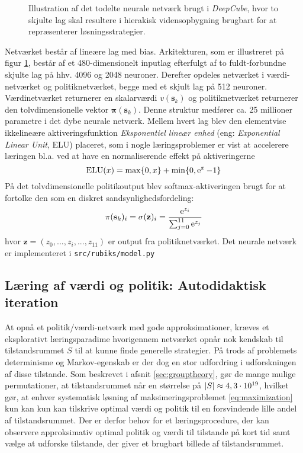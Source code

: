 \documentclass[../main.tex]{subfiles}
\begin{document}
\begin{figure}[H]
	\centering

\caption{Illustration af det todelte neurale netværk brugt i \textit{DeepCube}, hvor to skjulte lag skal resultere i hierakisk vidensopbygning brugbart for at repræsenterer løsningsstrategier.}
\label{fig:DNN}
\end{figure}
\noindent Netværket består af lineære lag med bias.  Arkitekturen, som er illustreret på figur \ref{fig:DNN}, består af et 480-dimensionelt inputlag efterfulgt af to fuldt-forbundne skjulte lag på hhv. 4096 og 2048 neuroner. Derefter opdeles netværket i værdi-netværket og politiknetværket, begge med et skjult lag på 512 neuroner. Værdinetværket returnerer en skalarværdi \(v(\mathbf s_k)\) og politiknetværket returnerer den tolvdimensionelle vektor \(\bm \pi (\mathbf s_k)\). Denne struktur medfører ca. 25 millioner parametre i det dybe neurale netværk. Mellem hvert lag blev den elementvise ikkelineære aktiveringsfunktion \textit{Eksponentiel lineær enhed} (eng: \textit{Exponential Linear Unit}, ELU) placeret, som i nogle læringsproblemer er vist at accelerere læringen bl.a. ved at have en normaliserende effekt på aktiveringerne \cite{ELU} 
\[
\operatorname{ELU}(x) = \operatorname*{max}\{0, x\} + \operatorname{min}\{0, \operatorname{e}^{x} -1\}
\]
På det tolvdimensionelle politikoutput blev softmax-aktiveringen brugt for at fortolke den som en diskret sandsynlighedsfordeling:
\[
\pi(\mathbf s_k)_i = \sigma(\mathbf z)_i = \frac{\operatorname{e}^{z_i}}{\sum_{j=0}^{11} \operatorname{e}^{z_j}}
\]
hvor \(\mathbf z=(z_0, ..., z_i, ..., z_{11})\) er output fra politiknetværket.
Det neurale netværk er implementeret i \texttt{src/rubiks/model.py}

\subsection*{Læring af værdi og politik: Autodidaktisk iteration}
At opnå et politik/værdi-netværk med gode approksimationer, kræves et eksplorativt læringsparadime hvorigennem netværket opnår nok kendskab til tilstandsrummet \(S\) til at kunne finde generelle strategier. 
På trods af problemets determinisme og Markov-egenskab er der dog en stor udfordring i udforskningen af disse tilstande.
Som beskrevet i afsnit \ref{sec:grouptheory}, gør de mange mulige permutationer, at tilstandsrummet når en størrelse på \(|S|\approx 4,3\cdot10^{19}\), hvilket gør, at enhver systematisk løsning af maksimeringsproblemet \ref{eq:maximization} kun kan kun kan tilskrive optimal værdi og politik til en forsvindende lille andel af tilstandsrummet.
Der er derfor behov for et læringsprocedure, der kan observere approksimativ optimal politik og værdi til tilstande på kort tid samt vælge at udforske tilstande, der giver et brugbart billede af tilstandsrummet.
\end{document}
